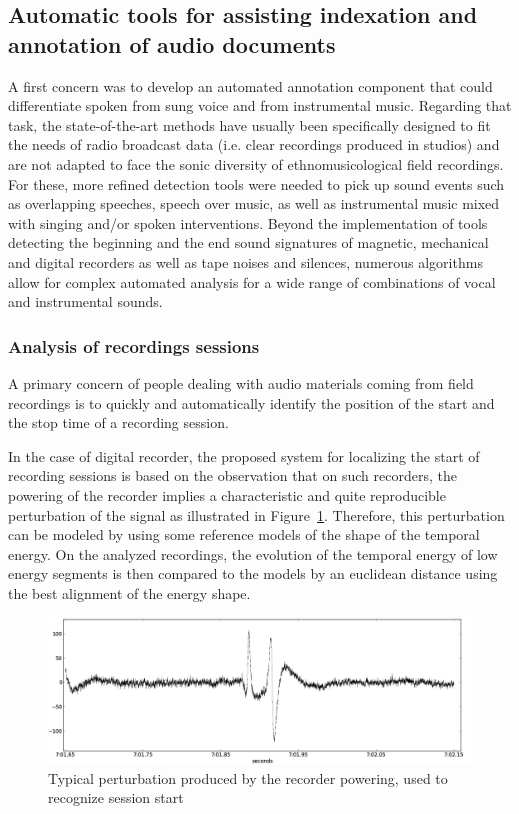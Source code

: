\documentclass{sig-alternate}
\begin{document}
\subsection{Automatic tools for assisting indexation and annotation of audio documents}
A first concern was to develop an automated annotation component that could differentiate spoken from sung voice and from instrumental music. Regarding that task, the state-of-the-art methods have usually been specifically designed to fit the needs of radio broadcast data (i.e. clear recordings produced in studios) and are not adapted to face the sonic diversity of ethnomusicological field recordings. For these, more refined detection tools were needed to pick up sound events such as overlapping speeches, speech over music, as well as instrumental music mixed with singing and/or spoken interventions.
Beyond the implementation of tools detecting the beginning and the end sound signatures of magnetic, mechanical and digital recorders as well as tape noises and silences, numerous algorithms allow for complex automated analysis for a wide range of combinations of vocal and instrumental sounds.


\subsubsection{Analysis of recordings sessions}
A primary concern of people dealing with audio materials coming from field recordings is to quickly and automatically identify the position of the start and the stop time of a recording session.

In the case of digital recorder, the proposed system for localizing the start of recording sessions is based on the observation that on such recorders, the powering of the recorder implies a characteristic and quite reproducible perturbation of the signal as illustrated in Figure~\ref{plop}. Therefore, this perturbation can be modeled by using some reference models of the shape of the temporal energy. On the analyzed recordings, the evolution of the temporal energy of low energy segments is then compared to the models by an euclidean distance using the best alignment of the energy shape.

\begin{figure}[htb]
 \centering
    \includegraphics[width=0.8\linewidth]{img/plop.png}
    \caption{Typical perturbation produced by the recorder powering, used to recognize session start}
    \label{plop}
\end{figure}
\end{document}
